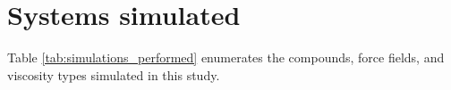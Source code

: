 \documentclass[preprint,review,12pt]{elsarticle}
\begin{document}
\begin{frontmatter}
%			
%			
%			
%			
%		
%			
%			
%			
%			
		
	\end{frontmatter}	
	
	
	\section{Systems simulated}
	
	Table \ref{tab:simulations_performed} enumerates the compounds, force fields, and viscosity types simulated in this study.
	
\end{document}
